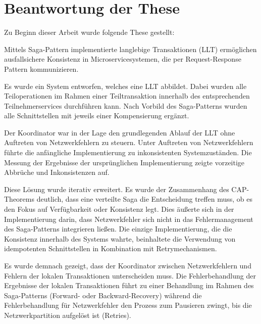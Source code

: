 \section{Beantwortung der These}

Zu Beginn dieser Arbeit wurde folgende These gestellt:

\begin{thesis*} 
Mittels Saga-Pattern implementierte langlebige Transaktionen (LLT) ermöglichen ausfallsichere Konsistenz in Microservicesystemen, die per Request-Response Pattern kommunizieren. 	
\end{thesis*}

Es wurde ein System entworfen, welches eine LLT abbildet. Dabei wurden alle Teiloperationen im Rahmen einer Teiltransaktion innerhalb des entsprechenden Teilnehmerservices durchführen kann. Nach Vorbild des Saga-Patterns wurden alle Schnittstellen mit jeweils einer Kompensierung ergänzt. 

Der Koordinator war in der Lage den grundlegenden Ablauf der LLT ohne Auftreten von Netzwerkfehlern zu steuern. Unter Auftreten von Netzwerkfehlern führte die anfängliche Implementierung zu inkonsistenten Systemzuständen. Die Messung der Ergebnisse der ursprünglichen Implementierung zeigte vorzeitige Abbrüche und Inkonsistenzen auf. 

Diese Lösung wurde iterativ erweitert. Es wurde der Zusammenhang des CAP-Theorems deutlich, dass eine verteilte Saga die Entscheidung treffen muss, ob es den Fokus auf Verfügbarkeit oder Konsistenz legt. Dies äußerte sich in der Implementierung darin, dass Netzwerkfehler sich nicht in das Fehlermanagement des Saga-Patterns integrieren ließen. Die einzige Implementierung, die die Konsistenz innerhalb des Systems wahrte, beinhaltete die Verwendung von idempotenten Schnittstellen in Kombination mit Retrymechanismen.

Es wurde demnach gezeigt, dass der Koordinator zwischen Netzwerkfehlern und Fehlern der lokalen Transaktionen unterscheiden muss. Die Fehlerbehandlung der Ergebnisse der lokalen Transaktionen führt zu einer Behandlung im Rahmen des Saga-Patterns (Forward- oder Backward-Recovery) während die Fehlerbehandlung für Netzwerkfehler den Prozess zum Pausieren zwingt, bis die Netzwerkpartition aufgelöst ist (Retries). 

